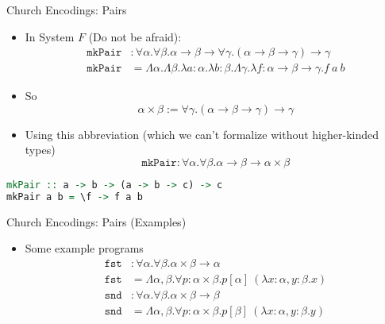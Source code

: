 \documentclass[leqno,presentation,usenames,dvipsnames]{beamer}
\begin{document}
\begin{frame}[fragile]{Church Encodings: Pairs}
    \begin{itemize}
        \item In System $F$ (Do not be afraid):
\begin{align*}
    \texttt{mkPair} &: \forall \alpha. \forall \beta. \alpha \to \beta \to \forall \gamma. (\alpha \to \beta \to \gamma) \to \gamma \\
    \texttt{mkPair} &= \Lambda \alpha. \Lambda \beta. \lambda a : \alpha. \lambda b : \beta. \Lambda \gamma. \lambda f : \alpha \to \beta \to \gamma. f~a~b
\end{align*}
        \item So
\[
    \alpha \times \beta := \forall \gamma. (\alpha \to \beta \to \gamma) \to \gamma
\]
        \item Using this abbreviation (which we can't formalize without higher-kinded types)
\[
    \texttt{mkPair} : \forall \alpha. \forall \beta. \alpha \to \beta \to \alpha \times \beta
\]
    \end{itemize}
\begin{lstlisting}[language=haskell, basicstyle=\small\ttfamily]
mkPair :: a -> b -> (a -> b -> c) -> c
mkPair a b = \f -> f a b
\end{lstlisting}
\end{frame}

\begin{frame}[fragile]{Church Encodings: Pairs (Examples)}
    \begin{itemize}
        \item Some example programs
\begin{align*}
    \texttt{fst} & : \forall \alpha. \forall \beta. \alpha \times \beta \to \alpha \\
    \texttt{fst} & = \Lambda \alpha, \beta. \forall p : \alpha \times \beta. p[\alpha]~(\lambda x : \alpha, y : \beta. x) \\
    \texttt{snd} & : \forall \alpha. \forall \beta. \alpha \times \beta \to \beta \\
    \texttt{snd} & = \Lambda \alpha, \beta. \forall p : \alpha \times \beta. p[\beta]~(\lambda x : \alpha, y : \beta. y)
\end{align*}
    \end{itemize}
\end{frame}
\end{document}
